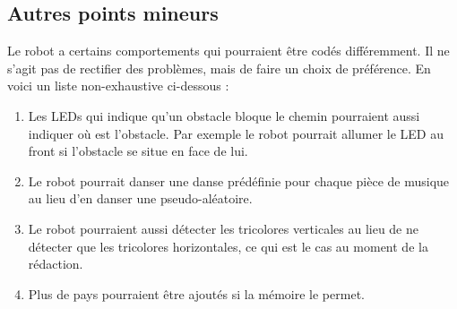 \documentclass{article}
\begin{document}
    \subsection{Autres points mineurs}
    Le robot a certains comportements qui pourraient être codés différemment.
    Il ne s'agit pas de rectifier des problèmes, mais de faire un choix de préférence.
    En voici un liste non-exhaustive ci-dessous : 
    \begin{enumerate}
        \item Les LEDs qui indique qu'un obstacle bloque le chemin pourraient aussi indiquer où est l'obstacle.
        Par exemple le robot pourrait allumer le LED au front si l'obstacle se situe en face de lui.
        \item Le robot pourrait danser une danse prédéfinie pour chaque pièce de musique au lieu d'en danser une pseudo-aléatoire.
        \item Le robot pourraient aussi détecter les tricolores verticales au lieu de ne détecter que les tricolores horizontales, ce qui est le cas au moment de la rédaction.
        \item Plus de pays pourraient être ajoutés si la mémoire le permet.
    \end{enumerate}
    
    
\end{document}
